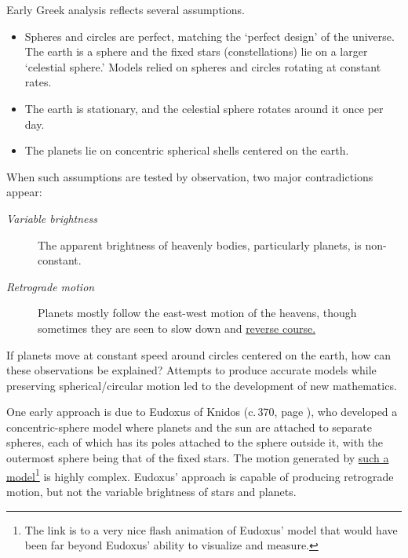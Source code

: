 Early Greek analysis reflects several assumptions.
\begin{itemize}
  \item Spheres and circles are perfect, matching the `perfect design' of the universe. The earth is a sphere and the fixed stars (constellations) lie on a larger `celestial sphere.' Models relied on spheres and circles rotating at constant rates.
  \item The earth is stationary, and the celestial sphere rotates around it once per day.
  \item The planets lie on concentric spherical shells centered on the earth.
\end{itemize}

When such assumptions are tested by observation, two major contradictions appear:
\begin{description}
  \item[\normalfont\emph{Variable brightness}] The apparent brightness of heavenly bodies, particularly planets, is non-constant.
  \item[\normalfont\emph{Retrograde motion}] Planets mostly follow the east-west motion of the heavens, though sometimes they are seen to slow down and \href{http://math.uci.edu/~ndonalds/math184/retrograde.html}{reverse course.}
\end{description}

If planets move at constant speed around circles centered on the earth, how can these observations be explained? Attempts to produce accurate models while preserving spherical/circular motion led to the development of new mathematics.\medbreak

One early approach is due to Eudoxus of Knidos (c.\,370\BC, page \pageref{pg:eudoxus}), who developed a concentric-sphere model where planets and the sun are attached to separate spheres, each of which has its poles attached to the sphere outside it, with the outermost sphere being that of the fixed stars. The motion generated by \href{%
	http://web.calstatela.edu/faculty/hmendel/Ancient Mathematics/Eudoxus/Astronomy/EudoxusHomocentricSpheres.htm}{such a model}\footnote{The link is to a very nice flash animation of Eudoxus' model that would have been far beyond Eudoxus' ability to visualize and measure.%
} is highly complex. Eudoxus' approach is capable of producing retrograde motion, but not the variable brightness of stars and planets.
\goodbreak



